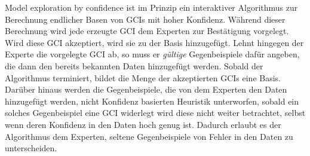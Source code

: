 \documentclass[ngerman,fleqn,DIV=12]{scrartcl}
\begin{document}
Model exploration by confidence ist im Prinzip ein interaktiver Algorithmus zur Berechnung
endlicher Basen von GCIs mit hoher Konfidenz.  Während dieser Berechnung wird jede
erzeugte GCI dem Experten zur Bestätigung vorgelegt.  Wird diese GCI akzeptiert, wird sie
zu der Basis hinzugefügt.  Lehnt hingegen der Experte die vorgelegte GCI ab, so muss er
\emph{gültige} Gegenbeispiele dafür angeben, die dann den bereits bekannten Daten
hinzugefügt werden.  Sobald der Algorithmus terminiert, bildet die Menge der akzeptierten
GCIs eine Basis.  Darüber hinaus werden die Gegenbeispiele, die von dem Experten den Daten
hinzugefügt werden, nicht Konfidenz basierten Heuristik unterworfen, \dh sobald ein
solches Gegenbeispiel eine GCI widerlegt wird diese nicht weiter betrachtet, selbst wenn
deren Konfidenz in den Daten hoch genug ist.  Dadurch erlaubt es der Algorithmus dem
Experten, seltene Gegenbeispiele von Fehler in den Daten zu unterscheiden.

\printbibliography{}
\end{document}
